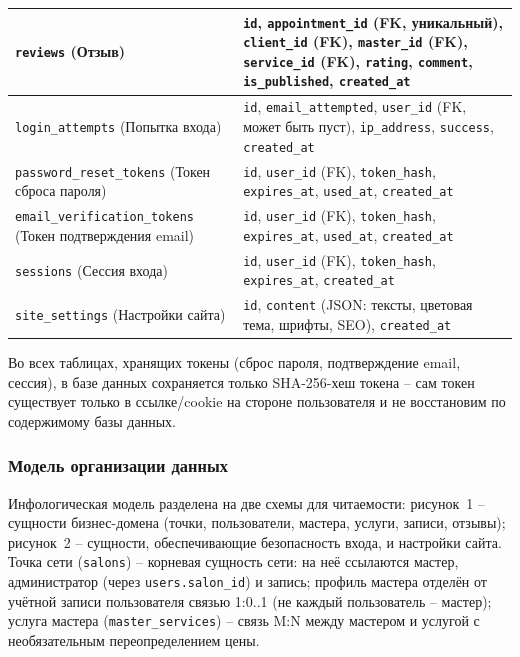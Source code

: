 \begin{xltabular}{\textwidth}{|p{4.2cm}|X|}
\texttt{reviews} (Отзыв) & \texttt{id}, \texttt{appointment\_id} (FK, уникальный), \texttt{client\_id} (FK), \texttt{master\_id} (FK), \texttt{service\_id} (FK), \texttt{rating}, \texttt{comment}, \texttt{is\_published}, \texttt{created\_at} \\\hline
\texttt{login\_attempts} (Попытка входа) & \texttt{id}, \texttt{email\_attempted}, \texttt{user\_id} (FK, может быть пуст), \texttt{ip\_address}, \texttt{success}, \texttt{created\_at} \\\hline
\texttt{password\_reset\_tokens} (Токен сброса пароля) & \texttt{id}, \texttt{user\_id} (FK), \texttt{token\_hash}, \texttt{expires\_at}, \texttt{used\_at}, \texttt{created\_at} \\\hline
\texttt{email\_verification\_tokens} (Токен подтверждения email) & \texttt{id}, \texttt{user\_id} (FK), \texttt{token\_hash}, \texttt{expires\_at}, \texttt{used\_at}, \texttt{created\_at} \\\hline
\texttt{sessions} (Сессия входа) & \texttt{id}, \texttt{user\_id} (FK), \texttt{token\_hash}, \texttt{expires\_at}, \texttt{created\_at} \\\hline
\texttt{site\_settings} (Настройки сайта) & \texttt{id}, \texttt{content} (JSON: тексты, цветовая тема, шрифты, SEO), \texttt{created\_at} \\\hline
\end{xltabular}

Во всех таблицах, хранящих токены (сброс пароля, подтверждение email, сессия), в базе данных сохраняется только SHA-256-хеш токена -- сам токен существует только в ссылке/cookie на стороне пользователя и не восстановим по содержимому базы данных.

\subsubsection{Модель организации данных}

Инфологическая модель разделена на две схемы для читаемости: рисунок~1 -- сущности бизнес-домена (точки, пользователи, мастера, услуги, записи, отзывы); рисунок~2 -- сущности, обеспечивающие безопасность входа, и настройки сайта. Точка сети (\texttt{salons}) -- корневая сущность сети: на неё ссылаются мастер, администратор (через \texttt{users.salon\_id}) и запись; профиль мастера отделён от учётной записи пользователя связью 1:0..1 (не каждый пользователь -- мастер); услуга мастера (\texttt{master\_services}) -- связь M:N между мастером и услугой с необязательным переопределением цены.

